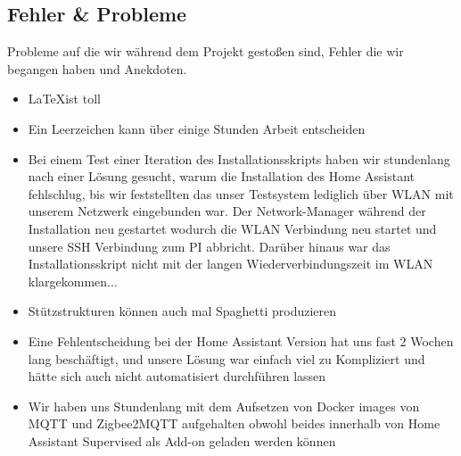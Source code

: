 \subsection{Fehler \& Probleme}\label{fz_fehler}
Probleme auf die wir während dem Projekt gestoßen sind, Fehler die wir begangen haben und Anekdoten.
\begin{itemize}
    \item \LaTeX ist toll
    \item Ein Leerzeichen kann über einige Stunden Arbeit entscheiden
    \item Bei einem Test einer Iteration des Installationsskripts haben wir stundenlang nach einer Lösung gesucht, warum die Installation des Home Assistant fehlschlug, bis wir feststellten das unser Testsystem lediglich über WLAN mit unserem Netzwerk eingebunden war. 
    Der Network-Manager während der Installation neu gestartet wodurch die WLAN Verbindung neu startet und unsere SSH Verbindung zum PI abbricht. Darüber hinaus war das Installationsskript nicht mit der langen Wiederverbindungszeit im WLAN klargekommen...
    \item Stützstrukturen können auch mal Spaghetti produzieren
    \item Eine Fehlentscheidung bei der Home Assistant Version hat uns fast 2 Wochen lang beschäftigt, und unsere Lösung war einfach viel zu Kompliziert und hätte sich auch nicht automatisiert durchführen lassen
    \item Wir haben uns Stundenlang mit dem Aufsetzen von Docker images von MQTT und Zigbee2MQTT aufgehalten obwohl beides innerhalb von Home Assistant Supervised als Add-on geladen werden können
\end{itemize}